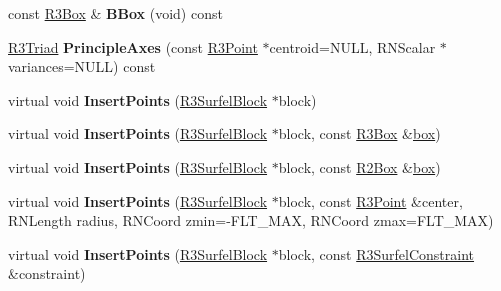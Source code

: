 \begin{DoxyCompactItemize}
\item 
const \hyperlink{class_r3_box}{R3\+Box} \& {\bfseries B\+Box} (void) const \hypertarget{class_r3_surfel_point_set_affd13530162878746a0cd72be6661f50}{}\label{class_r3_surfel_point_set_affd13530162878746a0cd72be6661f50}

\item 
\hyperlink{class_r3_triad}{R3\+Triad} {\bfseries Principle\+Axes} (const \hyperlink{class_r3_point}{R3\+Point} $\ast$centroid=N\+U\+LL, R\+N\+Scalar $\ast$variances=N\+U\+LL) const \hypertarget{class_r3_surfel_point_set_a36ed45880344f0ac22c5bf005344a9ba}{}\label{class_r3_surfel_point_set_a36ed45880344f0ac22c5bf005344a9ba}

\item 
virtual void {\bfseries Insert\+Points} (\hyperlink{class_r3_surfel_block}{R3\+Surfel\+Block} $\ast$block)\hypertarget{class_r3_surfel_point_set_a7960fb7a46d35cf3261700b1131574f9}{}\label{class_r3_surfel_point_set_a7960fb7a46d35cf3261700b1131574f9}

\item 
virtual void {\bfseries Insert\+Points} (\hyperlink{class_r3_surfel_block}{R3\+Surfel\+Block} $\ast$block, const \hyperlink{class_r3_box}{R3\+Box} \&\hyperlink{structbox}{box})\hypertarget{class_r3_surfel_point_set_a11b26f3406dc7b361b3ed21c105ce966}{}\label{class_r3_surfel_point_set_a11b26f3406dc7b361b3ed21c105ce966}

\item 
virtual void {\bfseries Insert\+Points} (\hyperlink{class_r3_surfel_block}{R3\+Surfel\+Block} $\ast$block, const \hyperlink{class_r2_box}{R2\+Box} \&\hyperlink{structbox}{box})\hypertarget{class_r3_surfel_point_set_ad26e590bf8ea32b1626a09c22f789139}{}\label{class_r3_surfel_point_set_ad26e590bf8ea32b1626a09c22f789139}

\item 
virtual void {\bfseries Insert\+Points} (\hyperlink{class_r3_surfel_block}{R3\+Surfel\+Block} $\ast$block, const \hyperlink{class_r3_point}{R3\+Point} \&center, R\+N\+Length radius, R\+N\+Coord zmin=-\/F\+L\+T\+\_\+\+M\+AX, R\+N\+Coord zmax=F\+L\+T\+\_\+\+M\+AX)\hypertarget{class_r3_surfel_point_set_a2e7d82aee71bedeafbeaf62d7913ccce}{}\label{class_r3_surfel_point_set_a2e7d82aee71bedeafbeaf62d7913ccce}

\item 
virtual void {\bfseries Insert\+Points} (\hyperlink{class_r3_surfel_block}{R3\+Surfel\+Block} $\ast$block, const \hyperlink{class_r3_surfel_constraint}{R3\+Surfel\+Constraint} \&constraint)\hypertarget{class_r3_surfel_point_set_a23be8d779290b62b437a16a4a10d0fbc}{}\label{class_r3_surfel_point_set_a23be8d779290b62b437a16a4a10d0fbc}


\end{DoxyCompactItemize}
